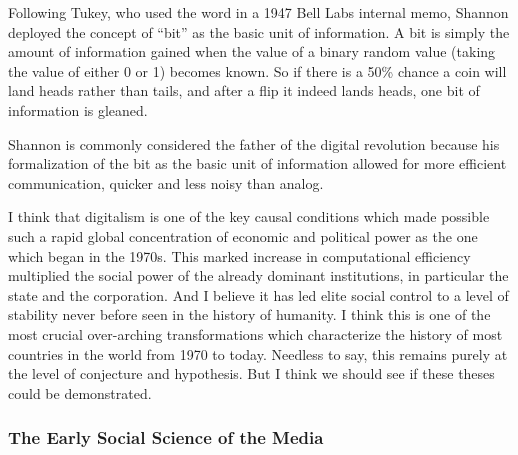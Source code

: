 \documentclass[12pt,book]{article}
\begin{document}
Following Tukey, who used the word in a 1947 Bell Labs internal memo,
Shannon deployed the concept of ``bit'' as the basic unit of
information. A bit is simply the amount of information gained when the
value of a binary random value (taking the value of either 0 or 1)
becomes known. So if there is a 50\% chance a coin will land heads
rather than tails, and after a flip it indeed lands heads, one bit of
information is gleaned.

Shannon is commonly considered the father of the digital revolution
because his formalization of the bit as the basic unit of information
allowed for more efficient communication, quicker and less noisy than
analog.

I think that digitalism is one of the key causal conditions which made
possible such a rapid global concentration of economic and political
power as the one which began in the 1970s. This marked increase in
computational efficiency multiplied the social power of the already
dominant institutions, in particular the state and the corporation. And
I believe it has led elite social control to a level of stability never
before seen in the history of humanity. I think this is one of the most
crucial over-arching transformations which characterize the history of
most countries in the world from 1970 to today. Needless to say, this
remains purely at the level of conjecture and hypothesis. But I think we
should see if these theses could be demonstrated.

\subsubsection{The Early Social Science of the
Media}\label{the-early-social-science-of-the-media}
\end{document}
